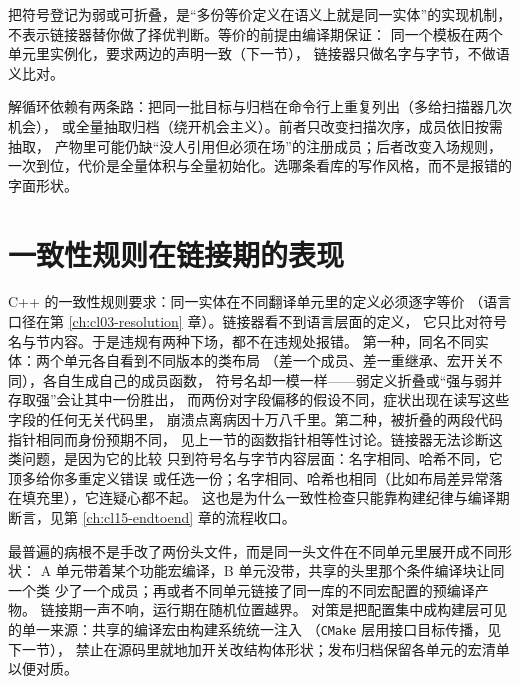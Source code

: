 \documentclass[12pt,a4paper,fontset=fandol]{ctexbook}
\newcommand{\Lang}[1]{\textsf{#1}}
\newcommand{\CPP}{\Lang{C++}}
\newcommand{\Tool}[1]{\texttt{#1}}
\begin{document}
\begin{note}[title={弱与折叠是身份，不是质量标记}]
把符号登记为弱或可折叠，是“多份等价定义在语义上就是同一实体”的实现机制，
不表示链接器替你做了择优判断。等价的前提由编译期保证：
同一个模板在两个单元里实例化，要求两边的声明一致（下一节），
链接器只做名字与字节，不做语义比对。
\end{note}

\begin{note}[title={顺序故障的两种解法别混用}]
解循环依赖有两条路：把同一批目标与归档在命令行上重复列出（多给扫描器几次机会），
或全量抽取归档（绕开机会主义）。前者只改变扫描次序，成员依旧按需抽取，
产物里可能仍缺“没人引用但必须在场”的注册成员；后者改变入场规则，
一次到位，代价是全量体积与全量初始化。选哪条看库的写作风格，而不是报错的字面形状。
\end{note}

\section{一致性规则在链接期的表现}\label{sec:cl08-odr}

\CPP{} 的一致性规则要求：同一实体在不同翻译单元里的定义必须逐字等价
（语言口径在第 \ref{ch:cl03-resolution} 章）。链接器看不到语言层面的定义，
它只比对符号名与节内容。于是违规有两种下场，都不在违规处报错。
第一种，同名不同实体：两个单元各自看到不同版本的类布局
（差一个成员、差一重继承、宏开关不同），各自生成自己的成员函数，
符号名却一模一样——弱定义折叠或“强与弱并存取强”会让其中一份胜出，
而两份对字段偏移的假设不同，症状出现在读写这些字段的任何无关代码里，
崩溃点离病因十万八千里。第二种，被折叠的两段代码指针相同而身份预期不同，
见上一节的函数指针相等性讨论。链接器无法诊断这类问题，是因为它的比较
只到符号名与字节内容层面：名字相同、哈希不同，它顶多给你多重定义错误
或任选一份；名字相同、哈希也相同（比如布局差异常落在填充里），它连疑心都不起。
这也是为什么一致性检查只能靠构建纪律与编译期断言，见第
\ref{ch:cl15-endtoend} 章的流程收口。

\begin{warning}[title={跨单元宏配置不一致：最常踩的那条}]
最普遍的病根不是手改了两份头文件，而是同一头文件在不同单元里展开成不同形状：
A 单元带着某个功能宏编译，B 单元没带，共享的头里那个条件编译块让同一个类
少了一个成员；再或者不同单元链接了同一库的不同宏配置的预编译产物。
链接期一声不响，运行期在随机位置越界。
对策是把配置集中成构建层可见的单一来源：共享的编译宏由构建系统统一注入
（\Tool{CMake} 层用接口目标传播，见下一节），
禁止在源码里就地加开关改结构体形状；发布归档保留各单元的宏清单以便对质。
\end{warning}
\end{document}
